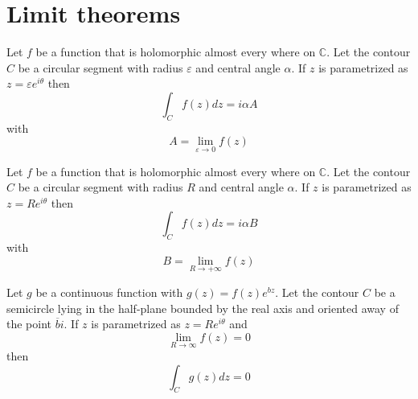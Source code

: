 \section{Limit theorems}
    	\begin{theorem}
			\label{complexcalculus:theorem:small_limit}
            Let $f$ be a function that is holomorphic almost every where on $\mathbb{C}$. Let the contour $C$ be a circular segment with radius $\varepsilon$ and central angle $\alpha$.
            If $z$ is parametrized as $z = \varepsilon e^{i\theta}$ then\[\int_Cf(z)dz = i\alpha A\]
            with \[A = \lim_{\varepsilon\rightarrow0}f(z)\]
		\end{theorem}
        \begin{theorem}
			\label{complexcalculus:theorem:great_limit}
            Let $f$ be a function that is holomorphic almost every where on $\mathbb{C}$. Let the contour $C$ be a circular segment with radius $R$ and central angle $\alpha$.
            If $z$ is parametrized as $z = Re^{i\theta}$ then\[\int_Cf(z)dz = i\alpha B\]
            with \[B = \lim_{R\rightarrow+\infty}f(z)\]
		\end{theorem}
        \begin{theorem}
			\label{complexcalculus:theorem:jordan}
            Let $g$ be a continuous function with $g(z) = f(z)e^{bz}$. Let the contour $C$ be a semicircle lying in the half-plane bounded by the real axis and oriented away of the point $\overline{b}i$. If $z$ is parametrized as $z=Re^{i\theta}$ and \[\lim_{R\rightarrow\infty}f(z) = 0\] then\[\int_Cg(z)dz = 0\]
		\end{theorem}
